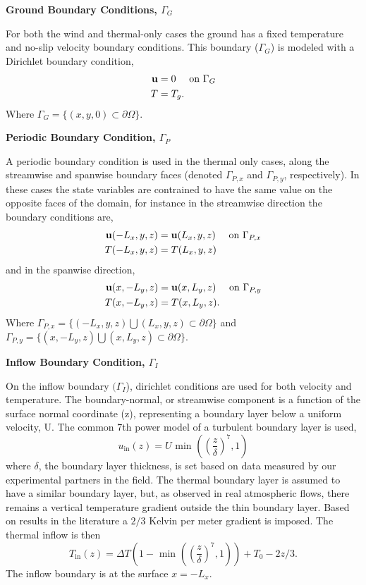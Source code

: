 \textbf{Ground Boundary Conditions, $\Gamma_G$} 

For both the wind and thermal-only cases the ground has a fixed
temperature and no-slip velocity boundary conditions. This boundary 
($\Gamma_G$) is modeled with a Dirichlet boundary condition, 
\begin{align}
 {\bf u} &= 0 \quad \text{ on } \Gamma_G \\
 T &= T_g.
\end{align}
Where $\Gamma_G = \{(x,y,0) \subset \partial \Omega \} $. 

%
%
%
\textbf{Periodic Boundary Condition, $\Gamma_P$} 

A periodic boundary condition is used in the thermal only cases, 
along the streamwise and spanwise boundary faces 
(denoted $\Gamma_{P,x}$ and $\Gamma_{P,y}$, respectively). In these
cases the state variables  
are contrained to have the same value on the opposite faces of the domain, 
for instance in the streamwise direction the boundary conditions are, 
\begin{align}
 {\bf u}(-L_x,y,z) &= {\bf u}(L_x,y,z) \quad \text{ on } \Gamma_{P,x} \\
 T(-L_x,y,z) &= T(L_x,y,z)
\end{align}
and in the spanwise direction,
\begin{align}
 {\bf u}(x,-L_y,z) &= {\bf u}(x,L_y,z) \quad \text{ on } \Gamma_{P,y} \\
 T(x,-L_y,z) &= T(x,L_y,z). 
\end{align}
Where $\Gamma_{P,x} = \{(-L_x,y,z) \bigcup (L_x,y,z) \subset \partial
\Omega \}$  
and $\Gamma_{P,y} = \{(x,-L_y,z) \bigcup (x,L_y,z) \subset \partial
\Omega \}$. 

\textbf{Inflow Boundary Condition, $\Gamma_I$} 

On the inflow boundary $(\Gamma_I$), dirichlet conditions are used for both
velocity and temperature. The boundary-normal, or streamwise component 
is a function of the surface normal coordinate (z), representing a boundary 
layer below a uniform velocity, U.
The common 7th power model of a turbulent boundary layer is used,   
\begin{equation*}
  u_{\text{in}}(z) = U \text{ min }\left(\left(\frac{z}{\delta}\right)^7,1\right)
  \label{eq:bl_u}
\end{equation*}
where $\delta$, the boundary layer thickness, is set based on data
measured by our experimental partners in the field. 
The thermal boundary layer is assumed to have a similar boundary layer,
but, as observed in real atmospheric flows, there remains a vertical
temperature gradient outside the thin boundary layer. Based on
results in the literature a $2/3$ Kelvin per meter gradient is 
imposed\cite{Blocken2007238}. The thermal inflow is then  
\begin{equation*}
  T_{\text{in}}(z) = \Delta T \left(1- \text{ min
			}\left(\left(\frac{z}{\delta}\right)^7,1\right)\right)
  + T_0 - 2z/3.  
  \label{eq:bl_t}
\end{equation*}
The inflow boundary is at the surface $x=-L_x$.

